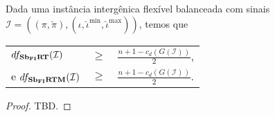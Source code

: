 \begin{theorem}\label{theorem:HELIIGVZ}
Dada uma instância intergênica flexível balanceada com sinais $\mathcal{I} = ((\pi,\breve\pi),(\iota,\breve\iota^{\min},\breve\iota^{\max}))$, temos que

\begin{tabular}{lll}
  $df_{\textbf{Sb\textsubscript{FI}RT}}(\mathcal{I})$     & $ \ge $ & $\frac{{n+1} - c_d(G(\mathcal{I} ))}{2}$, \\
  e $df_{\textbf{Sb\textsubscript{FI}RTM}}(\mathcal{I})$  & $ \ge $ & $\frac{{n+1} - c_d(G(\mathcal{I} ))}{2}$. \\
\end{tabular}
\end{theorem}
\begin{proof}
TBD.
\end{proof}
